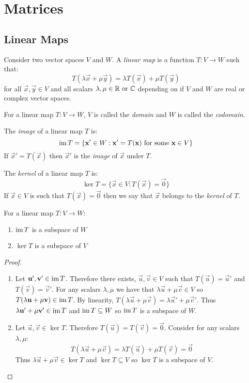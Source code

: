 \documentclass[../main.tex]{subfiles}
\begin{document}
\chapter{Matrices}
\section{Linear Maps}
\begin{definition}
  Consider two vector spaces $V$ and $W$.
  A \textit{linear map} is a function $T: V \to W$ such that:
  \[
    T(\lambda\vec{x} + \mu\vec{y}) = \lambda T(\vec{x}) + \mu T(\vec{y})
  \]
  for all $\vec{x}, \vec{y} \in V$ and all scalars $\lambda, \mu \in \mathbb{R} \text{ or }\mathbb{C}$ depending on if $V$ and $W$ are real or complex vector spaces.
\end{definition}
\begin{definition}
  For a linear map $T: V \to W$, $V$ is called the \textit{domain} and $W$ is called the \textit{codomain}.
\end{definition}
\begin{definition}[Image]
  The \textit{image} of a linear map $T$ is:
  \[
    \operatorname{im} T = \{\boldsymbol{\mathbf{x}}' \in W : \boldsymbol{\mathbf{x}}' = T(\boldsymbol{\mathbf{x}}) \text{ for some } \boldsymbol{\mathbf{x}} \in V\}
  \]
  If $\vec{x}' = T(\vec{x})$ then $\vec{x}'$ is the \textit{image} of $\vec{x}$ under $T$.
\end{definition}
\begin{definition}[Kernel]
  The \textit{kernel} of a linear map $T$ is:
  \[
    \ker T = \{ \vec{x} \in V : T(\vec{x}) = \vec{0}\}
  \]
  If $\vec{x} \in V$ is such that $T(\vec{x}) = \vec{0}$ then we say that $\vec{x}$ belongs to the \textit{kernel} of $T$.
\end{definition}
\begin{proposition}
  For a linear map $T: V \to W$:
  \begin{enumerate}
    \item $\operatorname{im} T$ is a subspace of $W$
    \item $\ker T$ is a subspace of $V$
  \end{enumerate}
\end{proposition}
\begin{proof}
\begin{enumerate}
  \item Let $\boldsymbol{\mathbf{u}}', \boldsymbol{\mathbf{v}}' \in \operatorname{im} T$.
    Therefore there exists, $\vec{u}, \vec{v} \in V$ such that $T(\vec{u}) = \vec{u}'$ and $T(\vec{v}) = \vec{v}'$.
    For any scalars $\lambda, \mu$ we have that $\lambda \vec{u} + \mu \vec{v} \in V$ so $T(\lambda \boldsymbol{\mathbf{u}} + \mu \boldsymbol{\mathbf{v}}) \in \operatorname{im} T$.
    By linearity, $T(\lambda \vec{u} + \mu \vec{v}) = \lambda \vec{u}' + \mu \vec{v}'$.
    Thus $\lambda \boldsymbol{\mathbf{u}}' + \mu \boldsymbol{\mathbf{v}}' \in \operatorname{im} T$ and $\operatorname{im} T \subseteq W$ so $\operatorname{im} T$ is a subspace of $W$.
  \item Let $\vec{u}, \vec{v} \in \ker T$. Therefore $T(\vec{u}) = T(\vec{v}) = \vec{0}$.
    Consider for any scalars $\lambda, \mu$:
    \[
      T(\lambda \vec{u} + \mu \vec{v}) = \lambda T(\vec{u}) + \mu T(\vec{v}) = \vec{0}
    \]
    Thus $\lambda \vec{u} + \mu \vec{v} \in \ker T$ and $\ker T \subseteq V$ so $\ker T$ is a subspace of $V$.
\end{enumerate}
\end{proof}
\end{document}
